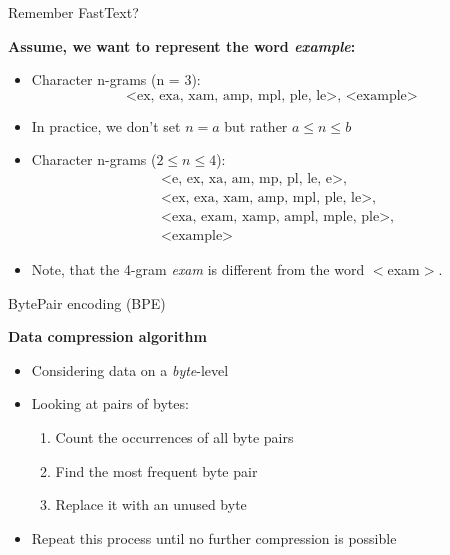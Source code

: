 
\begin{vbframe}{Remember FastText?}

\vfill

\textbf{Assume, we want to represent the word \textit{example}:}

\begin{itemize}
	\item Character n-grams (n = 3):  
		$$\text{<ex, exa, xam, amp, mpl, ple, le>, <example>}$$
	\item In practice, we don't set $n = a$ but rather $a \leq n \leq b$
	\item Character n-grams ($2 \leq n \leq 4$):
  \begin{align*}
    & \text{<e, ex, xa, am, mp, pl, le, e>,} \\
    & \text{<ex, exa, xam, amp, mpl, ple, le>,} \\
    & \text{<exa, exam, xamp, ampl, mple, ple>,} \\
		& \text{<example>}
  \end{align*}
	\item Note, that the 4-gram \textit{exam} is different from the word $<$exam$>$.
\end{itemize}

\vfill

\end{vbframe}


\begin{vbframe}{BytePair encoding (BPE)}

\vfill

\textbf{Data compression algorithm \href{https://www.derczynski.com/papers/archive/BPE_Gage.pdf}{}}

	\begin{itemize}
		\item Considering data on a \textit{byte}-level
		\item Looking at pairs of bytes:
			\begin{enumerate}
				\item Count the occurrences of all byte pairs
				\item Find the most frequent byte pair
				\item Replace it with an unused byte
			\end{enumerate}
		\item Repeat this process until no further compression is possible
	\end{itemize}

\vfill

\end{vbframe}

